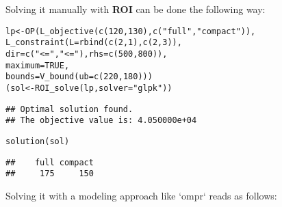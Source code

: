 \documentclass[a4paper]{article}\usepackage[]{graphicx}\usepackage[]{color}
\makeatletter
\newcommand{\hlnum}[1]{\textcolor[rgb]{0,0,0}{#1}}%
\newcommand{\hlstr}[1]{\textcolor[rgb]{0.741,0.553,0.545}{#1}}%
\newcommand{\hlstd}[1]{\textcolor[rgb]{0,0,0}{#1}}%
\newcommand{\hlkwb}[1]{\textcolor[rgb]{0.125,0.537,0.125}{#1}}%
\newcommand{\hlkwc}[1]{\textcolor[rgb]{0,0,1}{#1}}%
\newcommand{\hlkwd}[1]{\textcolor[rgb]{0,0,0}{#1}}%
\newenvironment{kframe}{%
 \def\at@end@of@kframe{}%
 \ifinner\ifhmode%
  \def\at@end@of@kframe{\end{minipage}}%
  \begin{minipage}{\columnwidth}%
 \fi\fi%
 \def\FrameCommand##1{\hskip\@totalleftmargin \hskip-\fboxsep
 \colorbox{shadecolor}{##1}\hskip-\fboxsep
     \hskip-\linewidth \hskip-\@totalleftmargin \hskip\columnwidth}%
 \MakeFramed {\advance\hsize-\width
   \@totalleftmargin\z@ \linewidth\hsize
   \@setminipage}}%
 {\par\unskip\endMakeFramed%
 \at@end@of@kframe}
\newenvironment{knitrout}{}{} %
\newcommand{\pkg}[1]{\textbf{#1}}
\makeatother
\begin{document}
Solving it manually with \pkg{ROI} can be done the following way:
\begin{knitrout}
\color{fgcolor}\begin{kframe}
\begin{alltt}
\hlstd{lp} \hlkwb{<-} \hlkwd{OP}\hlstd{(}\hlkwd{L_objective}\hlstd{(}\hlkwd{c}\hlstd{(}\hlnum{120}\hlstd{,} \hlnum{130}\hlstd{),} \hlkwd{c}\hlstd{(}\hlstr{"full"}\hlstd{,} \hlstr{"compact"}\hlstd{)),}
         \hlkwd{L_constraint}\hlstd{(}\hlkwc{L} \hlstd{=} \hlkwd{rbind}\hlstd{(}\hlkwd{c}\hlstd{(}\hlnum{2}\hlstd{,} \hlnum{1}\hlstd{),} \hlkwd{c}\hlstd{(}\hlnum{2}\hlstd{,} \hlnum{3}\hlstd{)),}
                      \hlkwc{dir} \hlstd{=} \hlkwd{c}\hlstd{(}\hlstr{"<="}\hlstd{,} \hlstr{"<="}\hlstd{),} \hlkwc{rhs} \hlstd{=} \hlkwd{c}\hlstd{(}\hlnum{500}\hlstd{,} \hlnum{800}\hlstd{)),}
         \hlkwc{maximum} \hlstd{=} \hlnum{TRUE}\hlstd{,}
         \hlkwc{bounds} \hlstd{=} \hlkwd{V_bound}\hlstd{(}\hlkwc{ub} \hlstd{=} \hlkwd{c}\hlstd{(}\hlnum{220}\hlstd{,} \hlnum{180}\hlstd{)))}
\hlstd{(sol} \hlkwb{<-} \hlkwd{ROI_solve}\hlstd{(lp,} \hlkwc{solver} \hlstd{=} \hlstr{"glpk"}\hlstd{))}
\end{alltt}
\begin{verbatim}
## Optimal solution found.
## The objective value is: 4.050000e+04
\end{verbatim}
\begin{alltt}
\hlkwd{solution}\hlstd{(sol)}
\end{alltt}
\begin{verbatim}
##    full compact 
##     175     150
\end{verbatim}
\end{kframe}
\end{knitrout}

Solving it with a modeling approach like `ompr` reads as follows:
\end{document}
